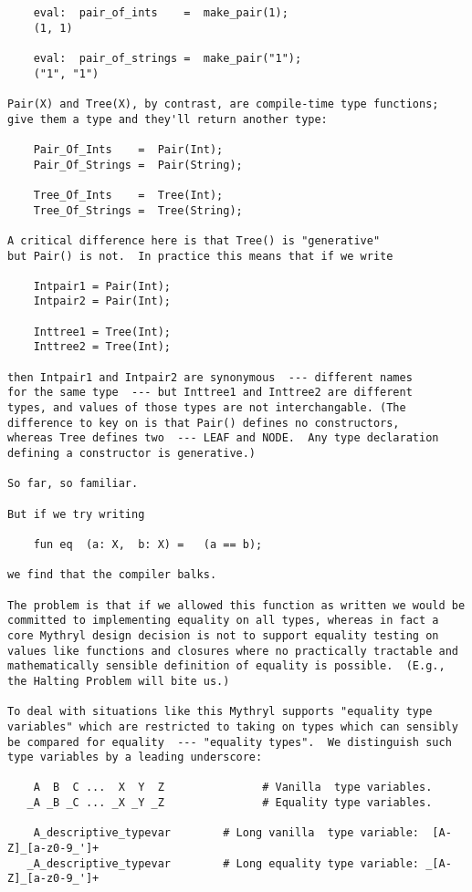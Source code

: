 \begin{verbatim}
    eval:  pair_of_ints    =  make_pair(1);  
    (1, 1) 

    eval:  pair_of_strings =  make_pair("1"); 
    ("1", "1") 

Pair(X) and Tree(X), by contrast, are compile-time type functions; 
give them a type and they'll return another type: 

    Pair_Of_Ints    =  Pair(Int); 
    Pair_Of_Strings =  Pair(String); 

    Tree_Of_Ints    =  Tree(Int); 
    Tree_Of_Strings =  Tree(String); 

A critical difference here is that Tree() is "generative" 
but Pair() is not.  In practice this means that if we write 

    Intpair1 = Pair(Int); 
    Intpair2 = Pair(Int); 

    Inttree1 = Tree(Int); 
    Inttree2 = Tree(Int); 

then Intpair1 and Intpair2 are synonymous  --- different names 
for the same type  --- but Inttree1 and Inttree2 are different 
types, and values of those types are not interchangable. (The 
difference to key on is that Pair() defines no constructors, 
whereas Tree defines two  --- LEAF and NODE.  Any type declaration 
defining a constructor is generative.) 

So far, so familiar. 

But if we try writing 

    fun eq  (a: X,  b: X) =   (a == b); 

we find that the compiler balks. 

The problem is that if we allowed this function as written we would be 
committed to implementing equality on all types, whereas in fact a 
core Mythryl design decision is not to support equality testing on 
values like functions and closures where no practically tractable and 
mathematically sensible definition of equality is possible.  (E.g., 
the Halting Problem will bite us.) 

To deal with situations like this Mythryl supports "equality type 
variables" which are restricted to taking on types which can sensibly 
be compared for equality  --- "equality types".  We distinguish such 
type variables by a leading underscore: 

    A  B  C ...  X  Y  Z               # Vanilla  type variables. 
   _A _B _C ... _X _Y _Z               # Equality type variables.  

    A_descriptive_typevar        # Long vanilla  type variable:  [A-Z]_[a-z0-9_']+ 
   _A_descriptive_typevar        # Long equality type variable: _[A-Z]_[a-z0-9_']+ 




\end{verbatim}
